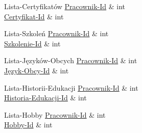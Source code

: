 \begin{attributesTable}{Lista-Certyfikatów}
\hline
\underline{Pracownik-Id} & int \\
\hline
\underline{Certyfikat-Id} & int \\
\end{attributesTable}

\begin{attributesTable}{Lista-Szkoleń}
\hline
\underline{Pracownik-Id} & int \\
\hline
\underline{Szkolenie-Id} & int \\
\end{attributesTable}

\begin{attributesTable}{Lista-Języków-Obcych}
\hline
\underline{Pracownik-Id} & int \\
\hline
\underline{Język-Obcy-Id} & int \\
\end{attributesTable}

\begin{attributesTable}{Lista-Historii-Edukacji}
\hline
\underline{Pracownik-Id} & int \\
\hline
\underline{Historia-Edukacji-Id} & int \\
\end{attributesTable}

\begin{attributesTable}{Lista-Hobby}
\hline
\underline{Pracownik-Id} & int \\
\hline
\underline{Hobby-Id} & int \\
\end{attributesTable}